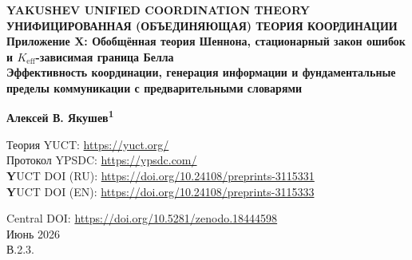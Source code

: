 \documentclass[12pt,a4paper]{article}
\theoremstyle{remark}
\begin{document}
	
	\begin{titlepage}
		\begin{center}
			\vspace*{1cm}
			
			\Huge\textbf{YAKUSHEV UNIFIED COORDINATION THEORY \\
				\vspace{1.0cm}
				\large	
				УНИФИЦИРОВАННАЯ (ОБЪЕДИНЯЮЩАЯ) ТЕОРИЯ КООРДИНАЦИИ \\
				\vspace{1.0cm}
				\Huge
				Приложение X: Обобщённая теория Шеннона, стационарный закон ошибок и \(K_{\mathrm{eff}}\)-зависимая граница Белла} \\
			\vspace{0.5cm}
			\Large\textbf{Эффективность координации, генерация информации и фундаментальные пределы коммуникации с предварительными словарями}
			
			\vspace{1.5cm}
			
			\Large\textbf{Алексей В. Якушев\textsuperscript{1}}
			
			Теория YUCT: \url{https://yuct.org/}\\
			Протокол YPSDC: \url{https://ypsdc.com/}\\
			
			\vspace{2cm}
			\small
			\textbf YUCT DOI (RU): \url{https://doi.org/10.24108/preprints-3115331} \\
			\textbf YUCT DOI (EN): \url{https://doi.org/10.24108/preprints-3115333}
			
			\vspace{1cm}
			
			\vspace{0cm}
			\large 
			Central DOI: \url{https://doi.org/10.5281/zenodo.18444598}\\
			\vspace{1cm}
			Июнь 2026 \\ \large В.2.3.
			
			\vspace{2cm}
			

\end{center}
\end{titlepage}
\end{document}
